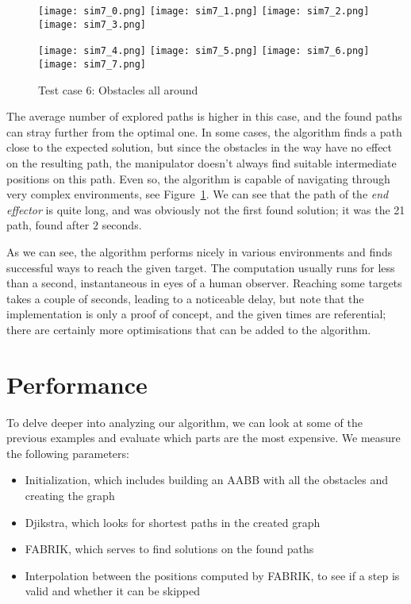 \begin{figure}[h]
  \centering
  \begin{minipage}{\textwidth}
    \texttt{[image: sim7\_0.png]}
    \texttt{[image: sim7\_1.png]}
    \texttt{[image: sim7\_2.png]}
    \texttt{[image: sim7\_3.png]}

    \texttt{[image: sim7\_4.png]}
    \texttt{[image: sim7\_5.png]}
    \texttt{[image: sim7\_6.png]}
    \texttt{[image: sim7\_7.png]}
  \end{minipage}
  \caption{Test case 6: Obstacles all around}\label{fig:sim7}
\end{figure}

The average number of explored paths is higher in this case, and the found paths can stray further from the optimal one. In some cases, the algorithm finds a path close to the expected solution, but since the obstacles in the way have no effect on the resulting path, the manipulator doesn't always find suitable intermediate positions on this path. Even so, the algorithm is capable of navigating through very complex environments, see Figure~\ref{fig:sim7}. We can see that the path of the \textit{end effector} is quite long, and was obviously not the first found solution; it was the 21\st{} path, found after $2$ seconds.

As we can see, the algorithm performs nicely in various environments and finds successful ways to reach the given target. The computation usually runs for less than a second, instantaneous in eyes of a human observer. Reaching some targets takes a couple of seconds, leading to a noticeable delay, but note that the implementation is only a proof of concept, and the given times are referential; there are certainly more optimisations that can be added to the algorithm.


\section{Performance}

To delve deeper into analyzing our algorithm, we can look at some of the previous examples and evaluate which parts are the most expensive. We measure the following parameters:

\begin{itemize}
\item Initialization, which includes building an AABB with all the obstacles and creating the graph
\item Djikstra, which looks for shortest paths in the created graph
\item FABRIK, which serves to find solutions on the found paths
\item Interpolation between the positions computed by FABRIK, to see if a step is valid and whether it can be skipped
\end{itemize}

